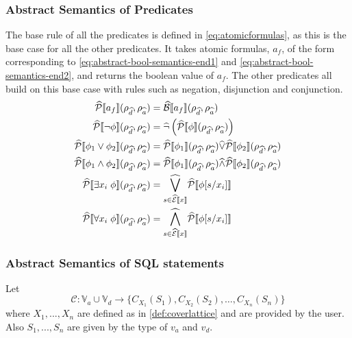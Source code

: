 \subsubsection{Abstract Semantics of Predicates}
The base rule of all the predicates is defined in \autoref{eq:atomicformulas}, as this is the base case for all the other predicates.
It takes atomic formulas, $a_f$, of the form corresponding to \autoref{eq:abstract-bool-semantics-end1} and \ref{eq:abstract-bool-semantics-end2}, and returns the boolean value of $a_f$.
The other predicates all build on this base case with rules such as negation, disjunction and conjunction.
\begin{align}\label{eq:atomicformulas}
    \abspredsem{a_f}(\rho_{\ab{d}}, \rho_{\ab{a}}) &= \absboolsem{a_f}(\rho_{\ab{d}}, \rho_{\ab{a}}) \\
    \abspredsem{\neg \phi}(\rho_{\ab{d}}, \rho_{\ab{a}}) &= \ab{\neg} \left( \abspredsem{\phi}(\rho_{\ab{d}}, \rho_{\ab{a}}) \right) \\
    \abspredsem{\phi_1 \lor \phi_2}(\rho_{\ab{d}}, \rho_{\ab{a}}) &= \abspredsem{\phi_1}(\rho_{\ab{d}}, \rho_{\ab{a}}) \ab{\lor} \abspredsem{\phi_2}(\rho_{\ab{d}}, \rho_{\ab{a}}) \\
    \abspredsem{\phi_1 \land \phi_2}(\rho_{\ab{d}}, \rho_{\ab{a}}) &= \abspredsem{\phi_1}(\rho_{\ab{d}}, \rho_{\ab{a}}) \ab{\land} \abspredsem{\phi_2}(\rho_{\ab{d}}, \rho_{\ab{a}}) \\
    \abspredsem{\exists x_i \; \phi}(\rho_{\ab{d}}, \rho_{\ab{a}}) &= \underset{s \in \absexpsem{x}}{\ab{\bigvee}} \abspredsem{\phi[s/x_i]} \\
    \abspredsem{\forall x_i \; \phi}(\rho_{\ab{d}}, \rho_{\ab{a}}) &= \underset{s \in \absexpsem{x}}{\ab{\bigwedge}} \abspredsem{\phi[s/x_i]}
\end{align}

\subsubsection{Abstract Semantics of SQL statements}

Let
\begin{equation}
    \mathcal{C} : \mathbb{V}_a \cup \mathbb{V}_d \rightarrow \{ C_{X_1}(S_1), C_{X_2}(S_2), \dots, C_{X_n}(S_n) \}
\end{equation}
where $X_1,...,X_n$ are defined as in \autoref{def:coverlattice} and are provided by the user.
Also $S_1,...,S_n$ are given by the type of $v_a$ and $v_d$.

